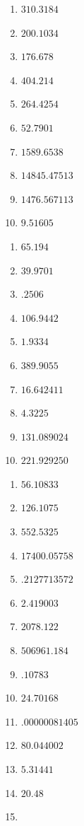 
\begin{multicols}{3}
\begin{enumerate}[$(1)$]
\item $310.3184$
\item $200.1034$
\item $176.678$
\item $404.214$
\item $264.4254$
\item $52.7901$
\item $1589.6538$
\item $14845.47513$
\item $1476.567113$
\item $9.51605$
\end{enumerate}
\end{multicols}


\begin{multicols}{3}
\begin{enumerate}[$(1)$]
\item $65.194$
\item $39.9701$
\item $.2506$
\item $106.9442$
\item $1.9334$
\item $389.9055$
\item $16.642411$
\item $4.3225$
\item $131.089024$
\item $221.929250$
\end{enumerate}
\end{multicols}


\begin{multicols}{3}
\begin{enumerate}[$(1)$]
\item $56.10833$
\item $126.1075$
\item $552.5325$
\item $17400.05758$
\item $.2127713572$
\item $2.419003$
\item $2078.122$
\item $506961.184$
\item $.10783$
\item $24.70168$
\item $.00000081405$
\item $80.044002$
\item $5.31441$
\item $20.48$
\item[]
\end{enumerate}
\end{multicols}

